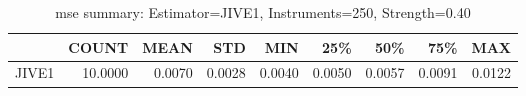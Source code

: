 \begin{table}[ht]
\centering
\caption{mse summary: Estimator=JIVE1, Instruments=250, Strength=0.40}
\begin{tabular}{lrrrrrrrr}
\toprule
 & COUNT & MEAN & STD & MIN & 25\% & 50\% & 75\% & MAX \\
\midrule
JIVE1 & 10.0000 & 0.0070 & 0.0028 & 0.0040 & 0.0050 & 0.0057 & 0.0091 & 0.0122 \\
\bottomrule
\end{tabular}
\end{table}
